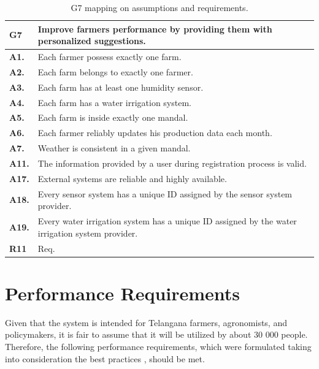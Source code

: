 \begin{table}[H]
    \centering
    \begin{tabularx}{\linewidth}{lX} \toprule
        \textbf{G7} & Improve farmers performance by providing them with personalized suggestions. \\ 
        \midrule
        \textbf{A1.} & Each farmer possess exactly one farm.\\
        \textbf{A2.} & Each farm belongs to exactly one farmer.\\ 
        \textbf{A3.} & Each farm has at least one humidity sensor.\\ 
        \textbf{A4.} & Each farm has a water irrigation system.\\ 
        \textbf{A5.} & Each farm is inside exactly one mandal.\\ 
        \textbf{A6.} & Each farmer reliably updates his production data each month.\\ 
        \textbf{A7.} & Weather is consistent in a given mandal.\\ 
        \textbf{A11.} & The information provided by a user during registration process is valid.\\ 
        \textbf{A17.} & External systems are reliable and highly available.\\
        \textbf{A18.} & Every sensor system has a unique ID assigned by the sensor system provider. \\
        \textbf{A19.} & Every water irrigation system has a unique ID assigned by the water irrigation system provider. \\
        \midrule
        \textbf{R11} &  Req. \\
        \bottomrule
    \end{tabularx}
    \caption{G7 mapping on assumptions and requirements.}
\end{table}

\section{Performance Requirements} \label{sec:performance_requirements}

Given that the system is intended for Telangana farmers, agronomists, and policymakers, it is fair to assume that it will be utilized by about 30 000 people. Therefore, the following performance requirements, which were formulated taking into consideration the best practices \cite{performance_requirements}, should be met.

